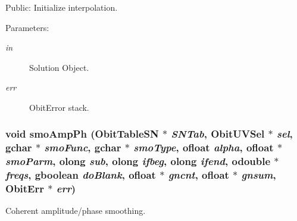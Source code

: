 Public: Initialize interpolation. 

\begin{Desc}
\item[Parameters:]
\begin{description}
\item[{\em in}]Solution Object. \item[{\em err}]Obit\-Error stack. \end{description}
\end{Desc}
\subsubsection{\setlength{\rightskip}{0pt plus 5cm}void smo\-Amp\-Ph ({\bf Obit\-Table\-SN} $\ast$ {\em SNTab}, {\bf Obit\-UVSel} $\ast$ {\em sel}, gchar $\ast$ {\em smo\-Func}, gchar $\ast$ {\em smo\-Type}, {\bf ofloat} {\em alpha}, {\bf ofloat} $\ast$ {\em smo\-Parm}, {\bf olong} {\em sub}, {\bf olong} {\em ifbeg}, {\bf olong} {\em ifend}, {\bf odouble} $\ast$ {\em freqs}, gboolean {\em do\-Blank}, {\bf ofloat} $\ast$ {\em gncnt}, {\bf ofloat} $\ast$ {\em gnsum}, {\bf Obit\-Err} $\ast$ {\em err})}\label{ObitUVSoln_8c_a18}


Coherent amplitude/phase smoothing. 

